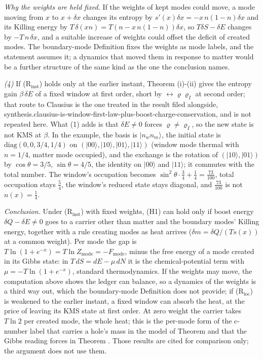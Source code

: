 \emph{Why the weights are held fixed.} If the weights of kept modes could move, a mode moving from $x$ to $x + \delta x$ changes its entropy by $s'(x)\delta x = -x\,n(1 - n)\delta x$ and its Killing energy by $T\,\delta(x n) = T(n - x\,n(1 - n))\delta x$, so $T\delta S - \delta E$ changes by $-T\,n\,\delta x$, and a suitable increase of weights could offset the deficit of created modes. The boundary-mode Definition fixes the weights as mode labels, and the statement assumes it; a dynamics that moved them in response to matter would be a further structure of the same kind as the one the conclusion names.

\emph{(4)} If (R$_{\mathrm{inst}}$) holds only at the earlier instant, Theorem (i)-(ii) gives the entropy gain $\beta\,\delta E$ of a fixed window at first order, short by $\rel{\varrho}{\varrho_{I}}$ at second order; that route to Clausius is the one treated in the result filed alongside, synthesis.clausius-is-window-first-law-plus-boost-charge-conservation, and is not repeated here. What (1) adds is that $\delta E \neq 0$ forces $\varrho \neq \varrho_I$, so the new state is not KMS at $\beta$. In the example, the basis is $|n_w n_m\rangle$, the initial state is $\mathrm{diag}(0, 0, 3/4, 1/4)$ on $(|00\rangle, |10\rangle, |01\rangle, |11\rangle)$ (window mode thermal with $n = 1/4$, matter mode occupied), and the exchange is the rotation of $(|10\rangle, |01\rangle)$ by $\cos\theta = 3/5$, $\sin\theta = 4/5$, the identity on $|00\rangle$ and $|11\rangle$; it commutes with the total number. The window's occupation becomes $\sin^2\theta\cdot\tfrac34 + \tfrac14 = \tfrac{73}{100}$, total occupation stays $\tfrac54$, the window's reduced state stays diagonal, and $\tfrac{73}{100}$ is not $n(x) = \tfrac14$.

\emph{Conclusion.} Under (R$_{\mathrm{inst}}$) with fixed weights, (H1) can hold only if boost energy $\delta Q - \delta E \neq 0$ goes to a carrier other than matter and the boundary modes' Killing energy, together with a rule creating modes as heat arrives ($\delta m = \delta Q/(T s(x))$ at a common weight). Per mode the gap is $T\ln(1 + e^{-x}) = T\ln Z_{\mathrm{mode}} = -F_{\mathrm{mode}}$, minus the free energy of a mode created in its Gibbs state: in $T\,dS = dE - \mu\,dN$ it is the chemical-potential term with $\mu = -T\ln(1 + e^{-x})$, standard thermodynamics. If the weights may move, the computation above shows the ledger can balance, so a dynamics of the weights is a third way out, which the boundary-mode Definition does not provide; if (R$_{\mathrm{loc}}$) is weakened to the earlier instant, a fixed window can absorb the heat, at the price of leaving its KMS state at first order. At zero weight the carrier takes $T\ln 2$ per created mode, the whole heat; this is the per-mode form of the c-number label that carries a hole's mass in the model of Theorem  and that the Gibbs reading forces in Theorem . Those results are cited for comparison only; the argument does not use them.

